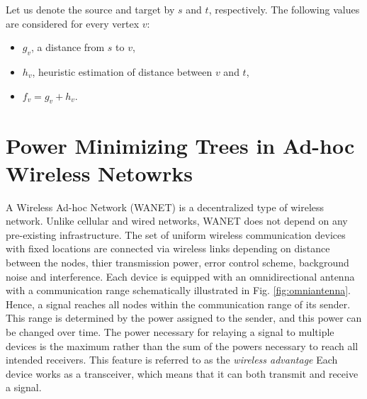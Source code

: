 Let us denote the source and target by $s$ and $t$, respectively.
The following values are considered for every vertex $v$:
\begin{itemize}
	\item $g_v$, a distance from $s$ to $v$,
	\item $h_v$, heuristic estimation of distance between $v$ and $t$, 
	\item $f_v=g_v+h_v$.
\end{itemize}


\section{Power Minimizing Trees in Ad-hoc Wireless Netowrks}\label{sec:smt}

A Wireless Ad-hoc Network (WANET) is a decentralized type of wireless network.
Unlike cellular and wired networks, WANET does not depend on any pre-existing infrastructure.
The set of uniform wireless communication devices with fixed locations are connected via wireless links depending on 
distance between the nodes, thier transmission power, error control scheme, background noise and interference.
Each device is equipped with an omnidirectional antenna with a communication range schematically illustrated in Fig. \ref{fig:omniantenna}.
Hence, a signal reaches all nodes within the communication range of its sender.
This range is determined by the power assigned to the sender, and this power can be changed over time.
The power necessary for relaying a signal to multiple devices is the maximum rather than the sum of the powers necessary to reach all intended receivers.
This feature is referred to as the \emph{wireless advantage} \cite{wieselthierXX}
Each device works as a transceiver, which means that it can both transmit and receive a signal.

